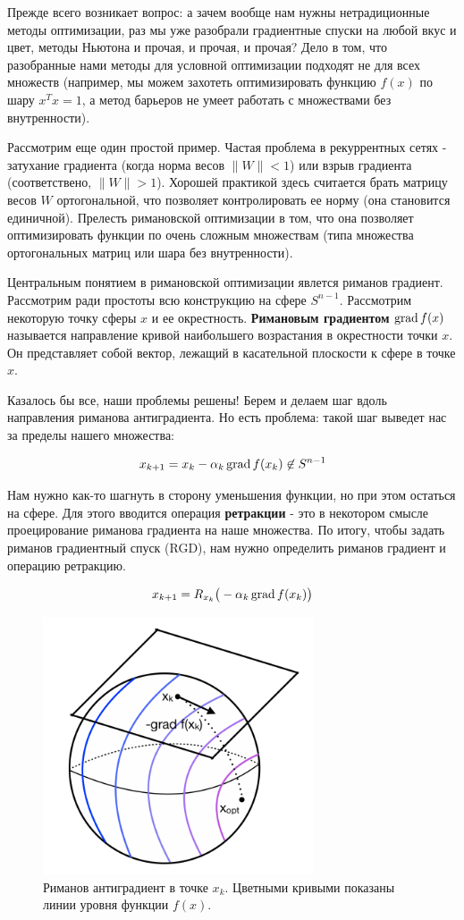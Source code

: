Прежде всего возникает вопрос: а зачем вообще нам нужны нетрадиционные методы оптимизации, раз мы уже разобрали градиентные спуски на любой вкус и цвет, методы Ньютона и прочая, и прочая, и прочая? Дело в том, что разобранные нами методы для условной оптимизации подходят не для всех множеств (например, мы можем захотеть оптимизировать функцию $f(x)$ по шару $x^T x = 1$, а метод барьеров не умеет работать с множествами без внутренности).

Рассмотрим еще один простой пример. Частая проблема в рекуррентных сетях - затухание градиента (когда норма весов $\|W\| < 1$) или взрыв градиента (соответствено, $\|W\| > 1$). Хорошей практикой здесь считается брать матрицу весов $W$ ортогональной, что позволяет контролировать ее норму (она становится единичной). Прелесть римановской оптимизации в том, что она позволяет оптимизировать функции по очень сложным множествам (типа множества ортогональных матриц или шара без внутренности).

Центральным понятием в римановской оптимизации явлется риманов градиент. Рассмотрим ради простоты всю конструкцию на сфере $S^{n-1}$. Рассмотрим некоторую точку сферы $x$ и ее окрестность. \textbf{Римановым градиентом} $\operatorname{grad} f(x)$ называется направление кривой наибольшего возрастания в окрестности точки $x$. Он представляет собой вектор, лежащий в касательной плоскости к сфере в точке $x$.

Казалось бы все, наши проблемы решены! Берем и делаем шаг вдоль направления риманова антиградиента. Но есть проблема: такой шаг выведет нас за пределы нашего множества:

$$
x_{k+1} = x_k - \alpha_k \operatorname{grad} f(x_k) \not\in S^{n-1}
$$

\noindent
Нам нужно как-то шагнуть в сторону уменьшения функции, но при этом остаться на сфере. Для этого вводится операция \textbf{ретракции} - это в некотором смысле проецирование риманова градиента на наше множества. По итогу, чтобы задать риманов градиентный спуск (RGD), нам нужно определить риманов градиент и операцию ретракцию.

$$
x_{k+1} = R_{x_k}\big(-\alpha_k \operatorname{grad} f(x_k)\big)
$$

\begin{figure}[H]
    \centering
    \includegraphics[width=8cm]{images/2-14-sphere.png}
    \caption{Риманов антиградиент в точке $x_k$. Цветными кривыми показаны линии уровня функции $f(x)$.}
    \label{fig:my_label}
\end{figure}

